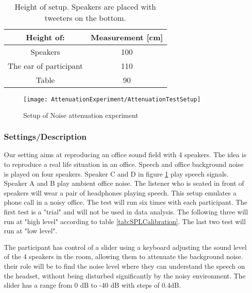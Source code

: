 \begin{table} [h]
	\centering
	\begin{tabular}{c c} \toprule
		\centering
		Height of:			 			& Measurement [cm] 	\\ \bottomrule
		Speakers					  	& 100				\\
		The ear of participant			& 110				\\ 
		Table							& 90				\\ \bottomrule 
	\end{tabular}
	\caption{Height of setup. Speakers are placed with tweeters on the bottom.}
	\label{Tab:NoiseAttenuationDimensions}
\end{table}


\begin{figure}[H]
	\centering
%	
	\texttt{[image: AttenuationExperiment/AttenuationTestSetup]}
	\caption{Setup of Noise attenuation experiment}
	\label{Fig:NoiseAttenuationExperimet}
\end{figure}


\subsubsection{Settings/Description}
Our setting aims at reproducing an office sound field with 4 speakers. 
The idea is to reproduce a real life situation in an office. Speech and office background noise is played on four speakers. Speaker C and D in figure \ref{Fig:NoiseAttenuationExperimet} play speech signals. Speaker A and B play ambient office noise. The listener who is seated in front of speakers will wear a pair of headphones playing speech. This setup emulates a phone call in a noisy office. The test will run six times with each participant. The first test is a "trial" and will not be used in data analysis. The following three will run at "high level" according to table \ref{tab:SPLCalibration}. The last two test will run at "low level". 

The participant has control of a slider using a keyboard adjusting the sound level of the 4 speakers in the room, allowing them to attenuate the background noise. their role will be to find the noise level where they can understand the speech on the headset, without being disturbed significantly by the noisy environment. The slider has a range from 0 dB to -40 dB with steps of 0.4dB. 

